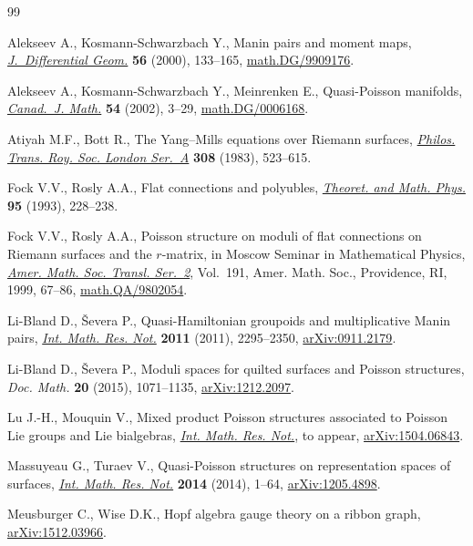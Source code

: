 \documentclass[10pt,a4paper]{amsart}
\numberwithin{equation}{section}
\begin{document}
\begin{thebibliography}{99}
\footnotesize\itemsep=0pt

Alekseev A., Kosmann-Schwarzbach Y., Manin pairs and moment maps,
 \href{https://doi.org/10.4310/jdg/1090347528}{\textit{J.~Differential Geom.}} \textbf{56} (2000), 133--165,
 \href{https://arxiv.org/abs/math.DG/9909176}{math.DG/9909176}.

Alekseev A., Kosmann-Schwarzbach Y., Meinrenken E., Quasi-{P}oisson manifolds,
 \href{https://doi.org/10.4153/CJM-2002-001-5}{\textit{Canad.~J. Math.}} \textbf{54} (2002), 3--29, \href{https://arxiv.org/abs/math.DG/0006168}{math.DG/0006168}.

Atiyah M.F., Bott R., The {Y}ang--{M}ills equations over {R}iemann surfaces,
 \href{https://doi.org/10.1098/rsta.1983.0017}{\textit{Philos. Trans. Roy. Soc. London Ser.~A}} \textbf{308} (1983),
 523--615.

Fock V.V., Rosly A.A., Flat connections and polyubles, \href{https://doi.org/10.1007/BF01017138}{\textit{Theoret. and
 Math. Phys.}} \textbf{95} (1993), 228--238.

Fock V.V., Rosly A.A., Poisson structure on moduli of f\/lat connections on
 {R}iemann surfaces and the {$r$}-mat\-rix, in Moscow {S}eminar in
 {M}athematical {P}hysics, \href{https://doi.org/10.1090/trans2/191/03}{\textit{Amer. Math. Soc. Transl. Ser.~2}}, Vol.~191,
 Amer. Math. Soc., Providence, RI, 1999, 67--86, \href{https://arxiv.org/abs/math.QA/9802054}{math.QA/9802054}.

Li-Bland D., \v{S}evera P., Quasi-{H}amiltonian groupoids and multiplicative
 {M}anin pairs, \href{https://doi.org/10.1093/imrn/rnq170}{\textit{Int. Math. Res. Not.}} \textbf{2011} (2011),
 2295--2350, \href{https://arxiv.org/abs/0911.2179}{arXiv:0911.2179}.

Li-Bland D., \v{S}evera P., Moduli spaces for quilted surfaces and {P}oisson
 structures, \textit{Doc. Math.} \textbf{20} (2015), 1071--1135,
 \href{https://arxiv.org/abs/1212.2097}{arXiv:1212.2097}.

Lu J.-H., Mouquin V., Mixed product Poisson structures associated to {P}oisson
 {L}ie groups and {L}ie bialgebras, \href{https://doi.org/10.1093/imrn/rnw189}{\textit{Int. Math. Res. Not.}}, {t}o appear,
 \href{https://arxiv.org/abs/1504.06843}{arXiv:1504.06843}.

Massuyeau G., Turaev V., Quasi-{P}oisson structures on representation spaces of
 surfaces, \href{https://doi.org/10.1093/imrn/rns215}{\textit{Int. Math. Res. Not.}} \textbf{2014} (2014), 1--64,
 \href{https://arxiv.org/abs/1205.4898}{arXiv:1205.4898}.

Meusburger C., Wise D.K., Hopf algebra gauge theory on a ribbon graph,
 \href{https://arxiv.org/abs/1512.03966}{arXiv:1512.03966}.

\end{thebibliography}
\end{document}
